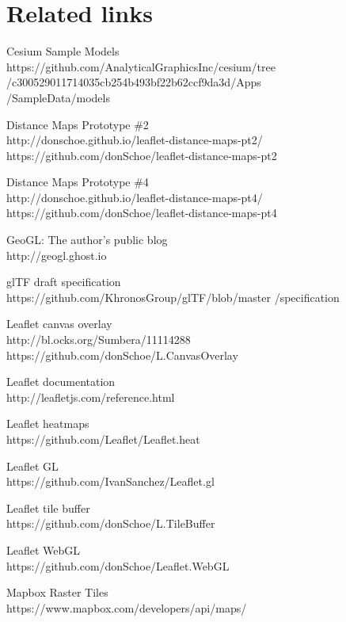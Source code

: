 \documentclass{motivation}
\begin{document}
\section{Related links}
  \begin{enumerate}[{[1]}]
  \setcounter{enumi}{8}
  \item Cesium Sample Models\\
    https://github.com/AnalyticalGraphicsInc/cesium/tree\\
    /c300529011714035cb254b493bf22b62ccf9da3d/Apps\\
    /SampleData/models
  \item Distance Maps Prototype \#2\\
    http://donschoe.github.io/leaflet-distance-maps-pt2/\\
    https://github.com/donSchoe/leaflet-distance-maps-pt2
  \item Distance Maps Prototype \#4\\
    http://donschoe.github.io/leaflet-distance-maps-pt4/\\
    https://github.com/donSchoe/leaflet-distance-maps-pt4
  \item GeoGL: The author's public blog\\
    http://geogl.ghost.io
  \item glTF draft specification\\
    https://github.com/KhronosGroup/glTF/blob/master
    /specification
  \item Leaflet canvas overlay\\
    http://bl.ocks.org/Sumbera/11114288\\
    https://github.com/donSchoe/L.CanvasOverlay
  \item Leaflet documentation\\
    http://leafletjs.com/reference.html
  \item Leaflet heatmaps\\
    https://github.com/Leaflet/Leaflet.heat
  \item Leaflet GL\\
    https://github.com/IvanSanchez/Leaflet.gl
  \item Leaflet tile buffer\\
    https://github.com/donSchoe/L.TileBuffer
  \item Leaflet WebGL\\
    https://github.com/donSchoe/Leaflet.WebGL
  \item Mapbox Raster Tiles\\
    https://www.mapbox.com/developers/api/maps/

\end{enumerate}
\end{document}
